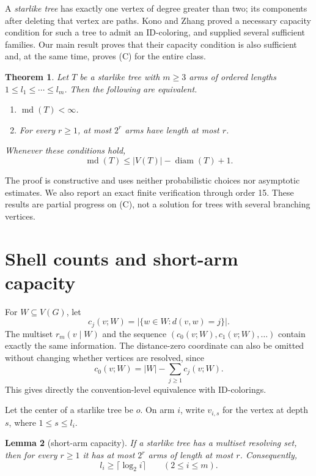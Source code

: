 \documentclass[11pt]{amsart}
\newtheorem{theorem}{Theorem}[section]
\newtheorem{lemma}[theorem]{Lemma}
\theoremstyle{definition}
\newcommand{\mdim}{\operatorname{md}}
\newcommand{\diam}{\operatorname{diam}}
\begin{document}
A \emph{starlike tree} has exactly one vertex of degree greater than two; its
components after deleting that vertex are paths.  Kono and Zhang
\cite[Proposition~2.1]{KonoZhang2021} proved a necessary capacity condition
for such a tree to admit an ID-coloring, and supplied several sufficient
families.  Our main result proves that their capacity condition is also
sufficient and, at the same time, proves (C) for the entire class.

\begin{theorem}\label{thm:intro}
Let \(T\) be a starlike tree with \(m\ge3\) arms of ordered lengths
\(1\le l_1\le\cdots\le l_m\).  Then the following are equivalent.
\begin{enumerate}
\item \(\mdim(T)<\infty\).
\item For every \(r\ge1\), at most \(2^r\) arms have length at most \(r\).
\end{enumerate}
Whenever these conditions hold,
\[
 \mdim(T)\le |V(T)|-\diam(T)+1.
\]
\end{theorem}

The proof is constructive and uses neither probabilistic choices nor
asymptotic estimates.  We also report an exact finite verification through
order 15.  These results are partial progress on (C), not a solution for
trees with several branching vertices.

\section{Shell counts and short-arm capacity}

For \(W\subseteq V(G)\), let
\[
 c_j(v;W)=|\{w\in W:d(v,w)=j\}|.
\]
The multiset \(r_m(v\mid W)\) and the sequence
\((c_0(v;W),c_1(v;W),\ldots)\) contain exactly the same information.  The
distance-zero coordinate can also be omitted without changing whether
vertices are resolved, since
\[
 c_0(v;W)=|W|-\sum_{j\ge1}c_j(v;W).
\]
This gives directly the convention-level equivalence with ID-colorings.

Let the center of a starlike tree be \(o\).  On arm \(i\), write \(v_{i,s}\)
for the vertex at depth \(s\), where \(1\le s\le l_i\).

\begin{lemma}[short-arm capacity]\label{lem:capacity}
If a starlike tree has a multiset resolving set, then for every \(r\ge1\) it
has at most \(2^r\) arms of length at most \(r\).  Consequently,
\[
 l_i\ge\lceil\log_2 i\rceil\qquad(2\le i\le m).
\]
\end{lemma}
\end{document}
